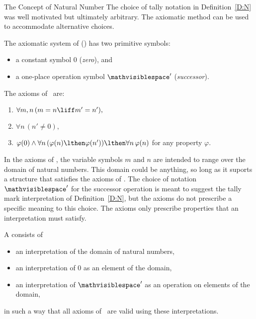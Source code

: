 \begin{unit}{The Concept of Natural Number}
The choice of tally notation in Definition~\ref{D:N} was well motivated but ultimately arbitrary.
The axiomatic method can be used to accommodate alternative choices.

\newcommand{\pax}[1]{\ensuremath{\mathsf{PA}_{\ref{PA:#1}}}}
\begin{definition}\label{D:PA}
  The axiomatic system of  \textup(\PA\textup) has two primitive symbols:
  \begin{itemize}
  \item a constant symbol \(0\) \textup (\emph{zero}\textup), and 
  \item a one-place operation symbol \(\mathvisiblespace'\) \textup(\emph{successor}\textup). 
  \end{itemize} 
  The axioms of \PA\ are: 
  \begin{enumerate}
  \item\label{PA:succ} \(\forall m, n\,(m = n \liff m' = n'),\)
  \item\label{PA:zero} \(\forall n\,(n' \neq 0),\)
  \item\label{PA:ind} \(\varphi(0) \land \forall n\,(\varphi(n) \lthen \varphi(n')) \lthen \forall n\,\varphi(n)\) for any property \(\varphi.\)
  \end{enumerate}
\end{definition}

\noindent
In the axioms of \PA, the variable symbols \(m\) and \(n\) are intended to range over the domain of natural numbers.
This domain could be anything, so long as it suports a structure that satisfies the axioms of \PA.
The choice of notation \(\mathvisiblespace'\) for the successor operation is meant to suggest the tally mark interpretation of Definition~\ref{D:N}, but the axioms do not prescribe a specific meaning to this choice.
The axioms only prescribe properties that an interpretation must satisfy.

\begin{definition}\label{D:PA}
  A  consists of
  \begin{itemize}
  \item an interpretation of the domain of natural numbers,
  \item an interpretation of \(0\) as an element of the domain,
  \item an interpretation of \(\mathvisiblespace'\) as an operation on elements of the domain,
  \end{itemize}
  in such a way that all axioms of \PA\ are valid using these interpretations.
\end{definition}


\end{unit}
